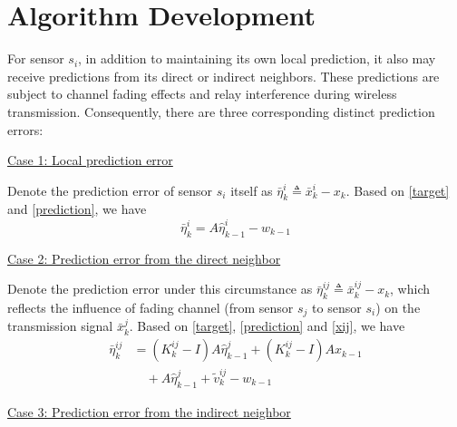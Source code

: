 \documentclass[twocolumn]{IEEEtran}
\begin{document}
\section{Algorithm Development} \label{sec:algorithm}

For sensor $s_{i}$, in addition to maintaining its own local prediction, it also may receive predictions from its direct or indirect neighbors. These predictions are subject to channel fading effects and relay interference during wireless transmission. Consequently, there are three corresponding distinct prediction errors:

\underline{Case 1: Local prediction error}

Denote the prediction error of sensor $s_{i}$ itself as $\bar{\eta}_{k}^{i}\triangleq\bar{x}_{k}^{i}-x_{k}$. Based on \eqref{target} and \eqref{prediction}, we have
\begin{equation*}
\bar{\eta}_{k}^{i}=A\hat{\eta}_{k-1}^{i}-w_{k-1}
\end{equation*}

\underline{Case 2: Prediction error from the direct neighbor}

Denote the prediction error under this circumstance as $\bar{\eta}_{k}^{ij}\triangleq\bar{x}_{k}^{ij}-x_{k}$, which reflects the influence of fading channel (from sensor $s_{j}$ to sensor $s_{i}$) on the transmission signal $\bar{x}_{k}^{j}$. Based on \eqref{target}, \eqref{prediction} and \eqref{xij}, we have
\begin{equation*}
\begin{split}
\bar{\eta}_{k}^{ij}&=(K_{k}^{ij}-I)A\hat{\eta}_{k-1}^{j}+(K_{k}^{ij}-I)Ax_{k-1 }\\
&\quad+A\hat{\eta}_{k-1}^{j}+\tilde{v}_{k}^{ij}-w_{k-1}
\end{split}
\end{equation*}

\underline{Case 3: Prediction error from the indirect neighbor}
\end{document}

